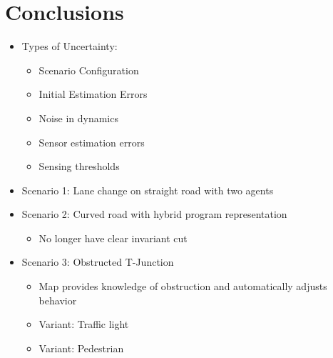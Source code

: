 \documentclass{easychair}
\theoremstyle{theorem}
\theoremstyle{remark}
\begin{document}
\section{Conclusions}

	\begin{itemize}
		\item Types of Uncertainty:
		\begin{itemize}
			\item Scenario Configuration
			\item Initial Estimation Errors
			\item Noise in dynamics
			\item Sensor estimation errors
			\item Sensing thresholds
		\end{itemize}
	\end{itemize}
	\begin{itemize}
		\item Scenario 1: Lane change on straight road with two agents
		
		\item Scenario 2: Curved road with hybrid program representation
		\begin{itemize}
			\item No longer have clear invariant cut
		\end{itemize}
		\item Scenario 3: Obstructed T-Junction
		\begin{itemize}
			\item Map provides knowledge of obstruction and automatically adjusts behavior
		\end{itemize}
		\begin{itemize}
			\item Variant: Traffic light
			\item Variant: Pedestrian
		\end{itemize}
	\end{itemize}


\label{sect:bib}

%
%
%

\end{document}
